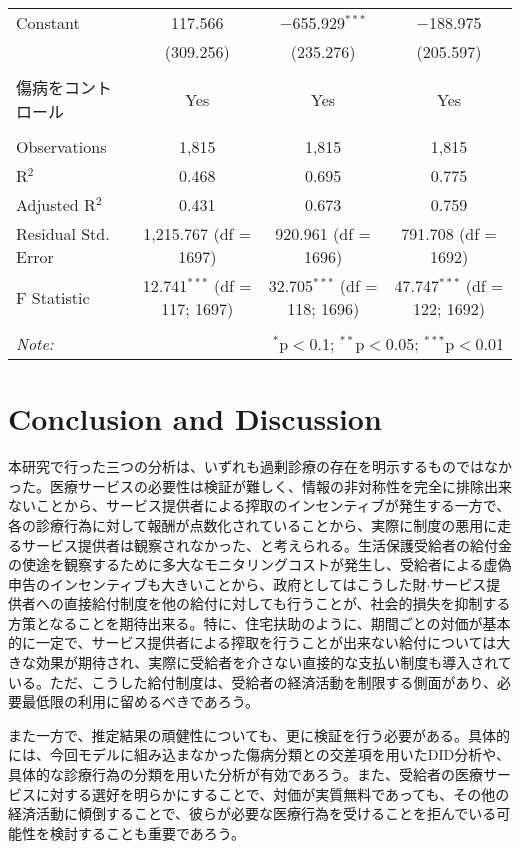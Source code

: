 \documentclass{jsarticle}
\begin{document}
\begin{table}[!htbp]
\begin{tabular}{@{\extracolsep{5pt}}lccc}
 Constant & 117.566 & $-$655.929$^{***}$ & $-$188.975 \\ 
  & (309.256) & (235.276) & (205.597) \\ 
  & & & \\ 
  傷病をコントロール & Yes & Yes & Yes \\
\hline \\[-1.8ex] 
Observations & 1,815 & 1,815 & 1,815 \\ 
R$^{2}$ & 0.468 & 0.695 & 0.775 \\ 
Adjusted R$^{2}$ & 0.431 & 0.673 & 0.759 \\ 
Residual Std. Error & 1,215.767 (df = 1697) & 920.961 (df = 1696) & 791.708 (df = 1692) \\ 
F Statistic & 12.741$^{***}$ (df = 117; 1697) & 32.705$^{***}$ (df = 118; 1696) & 47.747$^{***}$ (df = 122; 1692) \\ 
\hline 
\hline \\[-1.8ex] 
\textit{Note:}  & \multicolumn{3}{r}{$^{*}$p$<$0.1; $^{**}$p$<$0.05; $^{***}$p$<$0.01} \\ 
\end{tabular} 
\end{table}


\section{Conclusion and Discussion}

本研究で行った三つの分析は、いずれも過剰診療の存在を明示するものではなかった。医療サービスの必要性は検証が難しく、情報の非対称性を完全に排除出来ないことから、サービス提供者による搾取のインセンティブが発生する一方で、各の診療行為に対して報酬が点数化されていることから、実際に制度の悪用に走るサービス提供者は観察されなかった、と考えられる。生活保護受給者の給付金の使途を観察するために多大なモニタリングコストが発生し、受給者による虚偽申告のインセンティブも大きいことから、政府としてはこうした財$\cdot$サービス提供者への直接給付制度を他の給付に対しても行うことが、社会的損失を抑制する方策となることを期待出来る。特に、住宅扶助のように、期間ごとの対価が基本的に一定で、サービス提供者による搾取を行うことが出来ない給付については大きな効果が期待され、実際に受給者を介さない直接的な支払い制度も導入されている。ただ、こうした給付制度は、受給者の経済活動を制限する側面があり、必要最低限の利用に留めるべきであろう。

また一方で、推定結果の頑健性についても、更に検証を行う必要がある。具体的には、今回モデルに組み込まなかった傷病分類との交差項を用いたDID分析や、具体的な診療行為の分類を用いた分析が有効であろう。また、受給者の医療サービスに対する選好を明らかにすることで、対価が実質無料であっても、その他の経済活動に傾倒することで、彼らが必要な医療行為を受けることを拒んでいる可能性を検討することも重要であろう。
\end{document}
